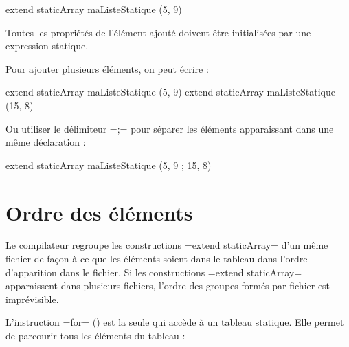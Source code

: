 \begin{PLM}
extend staticArray maListeStatique (5, 9)
\end{PLM}

Toutes les propriétés de l'élément ajouté doivent être initialisées par une expression statique. 

Pour ajouter plusieurs éléments, on peut écrire :
\begin{PLM}
extend staticArray maListeStatique (5, 9)
extend staticArray maListeStatique (15, 8)
\end{PLM}

Ou utiliser le délimiteur \plm=;= pour séparer les éléments apparaissant dans une même déclaration :
\begin{PLM}
extend staticArray maListeStatique (5, 9 ; 15, 8)
\end{PLM}

\section{Ordre des éléments}

Le compilateur regroupe les constructions \plm=extend staticArray= d'un même fichier de façon à ce que les éléments soient dans le tableau dans l'ordre d'apparition dans le fichier. Si les constructions \plm=extend staticArray= apparaissent dans plusieurs fichiers, l'ordre des groupes formés par fichier est imprévisible.









L'instruction \plm=for= () est la seule qui accède à un tableau statique. Elle permet de parcourir tous les éléments du tableau :


